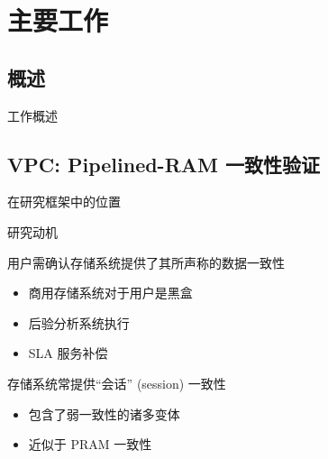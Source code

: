 \section{主要工作}

\subsection{概述}

\begin{frame}{工作概述}
\end{frame}
\subsection{VPC: Pipelined-RAM 一致性验证}

\begin{frame}{在研究框架中的位置}
\end{frame}

\begin{frame}{研究动机}
  \vspace{0.50cm}

  \begin{description}
    \setlength{\itemsep}{5pt}
    \item[验证:] 用户需确认存储系统提供了其所声称的数据一致性  
      \begin{itemize}
        \item 商用存储系统对于用户是黑盒
        \item 后验分析系统执行
        \item SLA 服务补偿 
      \end{itemize}
    \item[PRAM:] 存储系统常提供``会话'' (session) 一致性 
       
      \begin{itemize}
	\item 包含了弱一致性的诸多变体 
	\item 近似于 PRAM 一致性  
      \end{itemize}
  \end{description}
\end{frame}



